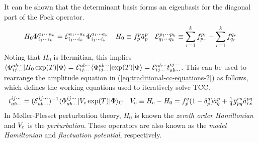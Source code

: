 \documentclass[11pt]{article}
\numberwithin{equation}{section}
\begin{document}
\begin{rmk}
It can be shown that the determinant basis forms an eigenbasis for the diagonal part of the Fock operator.\footnotemark
\begin{align}
  H_0\Phi _{i_1\cdots i_k}^{a_1\cdots a_k}
=
  \mathcal{E}_{i_1\cdots i_k}^{a_1\cdots a_k}
  \Phi _{i_1\cdots i_k}^{a_1\cdots a_k}
&&
  H_0
\equiv
  f_p^p\tilde{a}^p_p
&&
  \mathcal{E}_{q_1\cdots q_k}^{p_1\cdots p_k}
\equiv
  \sum_{r=1}^k
  f_{p_r}^{p_r}
-
  \sum_{r=1}^k
  f_{q_r}^{q_r}
\end{align}
Noting that $H_0$ is Hermitian, this implies $\langle\Phi _{ij\cdots}^{ab\cdots}|H_0\,\mathrm{exp}(T)|\Phi \rangle=\mathcal{E}_{ij\cdots}^{ab\cdots}\langle\Phi _{ij\cdots}^{ab\cdots}|\mathrm{exp}(T)|\Phi \rangle=\mathcal{E}_{ij\cdots}^{ab\cdots}t_{ab\cdots}^{ij\cdots}$.
This can be used to rearrange the amplitude equation in (\ref{eq:traditional-cc-equations-2}) as follows, which defines the working equations used to iteratively solve TCC.
\begin{align}
  t_{ab\cdots}^{ij\cdots}
=
  (\mathcal{E}_{ab\cdots}^{ij\cdots})^{-1}
  \langle\Phi _{ab\cdots}^{ij\cdots}|V_{\mathrm{c}}\,\mathrm{exp}(T)|\Phi \rangle_{\mathrm{C}}
&&
  V_{\mathrm{c}}
\equiv
  H_{\mathrm{c}}
-
  H_0
=
  f_p^q(1-\delta _p^q)
  \tilde{a}^p_q
+
  \tfrac{1}{4}
  \overline{g}_{pq}^{rs}
  \tilde{a}^{pq}_{rs}
\end{align}
In M\o ller-Plesset perturbation theory, $H_0$ is known the \textit{zeroth order Hamiltonian} and $V_{\mathrm{c}}$ is the \textit{perturbation}.
These operators are also known as the \textit{model Hamiltonian} and \textit{fluctuation potential}, respectively.
\end{rmk}
\end{document}
